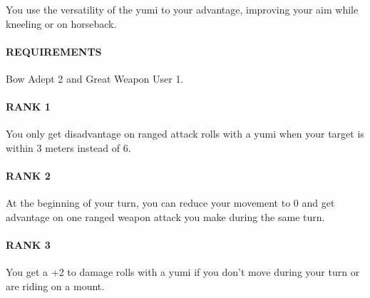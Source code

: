 \normalsize
You use the versatility of the yumi to your advantage, improving your aim while kneeling or on horseback.
\paragraph{REQUIREMENTS} Bow Adept 2 and Great Weapon User 1.
\paragraph{RANK 1} You only get disadvantage on ranged attack rolls with a yumi when your target is within 3 meters instead of 6.
\paragraph{RANK 2} At the beginning of your turn, you can reduce your movement to 0 and get advantage on one ranged weapon attack you make during the same turn.
\paragraph{RANK 3} You get a +2 to damage rolls with a yumi if you don't move during your turn or are riding on a mount.


